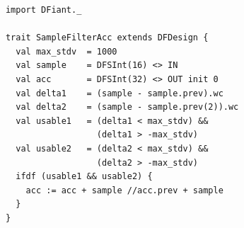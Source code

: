 \begin{table}[t!]
  \centering
  \begin{minipage}[t][23cm][t]{0.46\linewidth}
    \centering
    \begin{verbatim}
      import DFiant._
      
      trait SampleFilterAcc extends DFDesign {
        val max_stdv  = 1000
        val sample    = DFSInt(16) <> IN
        val acc       = DFSInt(32) <> OUT init 0
        val delta1    = (sample - sample.prev).wc
        val delta2    = (sample - sample.prev(2)).wc
        val usable1   = (delta1 < max_stdv) && 
                        (delta1 > -max_stdv)
        val usable2   = (delta2 < max_stdv) && 
                        (delta2 > -max_stdv)
        ifdf (usable1 && usable2) {
          acc := acc + sample //acc.prev + sample
        }
      }    
      

\end{verbatim}
\end{minipage}
\end{table}
